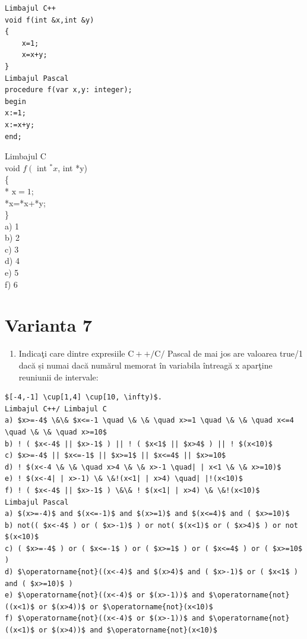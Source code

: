 \documentclass[10pt]{article}
\begin{document}
\begin{verbatim}
Limbajul C++
void f(int &x,int &y)
{
    x=1;
    x=x+y;
}
Limbajul Pascal
procedure f(var x,y: integer);
begin
x:=1;
x:=x+y;
end;
\end{verbatim}

Limbajul C\\
void $f\left(\right.$ int ${ }^{*} x$, int *y)\\
\{\\
* $\mathrm{x}=1$;\\
*x=*x+*y;\\
\}\\
a) 1\\
b) 2\\
c) 3\\
d) 4\\
e) 5\\
f) 6

\section*{Varianta 7}
\begin{enumerate}
  \item Indicaţi care dintre expresiile $\mathrm{C}++/ \mathrm{C} /$ Pascal de mai jos are valoarea true/1 dacă și numai dacă numărul memorat în variabila întreagă x aparţine reuniunii de intervale:
\end{enumerate}

\begin{verbatim}
$[-4,-1] \cup[1,4] \cup[10, \infty)$.
Limbajul C++/ Limbajul C
a) $x>=-4$ \&\& $x<=-1 \quad \& \& \quad x>=1 \quad \& \& \quad x<=4 \quad \& \& \quad x>=10$
b) ! ( $x<-4$ || $x>-1$ ) || ! ( $x<1$ || $x>4$ ) || ! $(x<10)$
c) $x>=-4$ || $x<=-1$ || $x>=1$ || $x<=4$ || $x>=10$
d) ! $(x<-4 \& \& \quad x>4 \& \& x>-1 \quad| | x<1 \& \& x>=10)$
e) ! $(x<-4| | x>-1) \& \&!(x<1| | x>4) \quad| |!(x<10)$
f) ! ( $x<-4$ || $x>-1$ ) \&\& ! $(x<1| | x>4) \& \&!(x<10)$
Limbajul Pascal
a) $(x>=-4)$ and $(x<=-1)$ and $(x>=1)$ and $(x<=4)$ and ( $x>=10)$
b) not(( $x<-4$ ) or ( $x>-1)$ ) or not( $(x<1)$ or ( $x>4)$ ) or not $(x<10)$
c) ( $x>=-4$ ) or ( $x<=-1$ ) or ( $x>=1$ ) or ( $x<=4$ ) or ( $x>=10$ )
d) $\operatorname{not}((x<-4)$ and $(x>4)$ and ( $x>-1)$ or ( $x<1$ ) and ( $x>=10)$ )
e) $\operatorname{not}((x<-4)$ or $(x>-1))$ and $\operatorname{not}((x<1)$ or $(x>4))$ or $\operatorname{not}(x<10)$
f) $\operatorname{not}((x<-4)$ or $(x>-1))$ and $\operatorname{not}((x<1)$ or $(x>4))$ and $\operatorname{not}(x<10)$
\end{verbatim}
\end{document}
